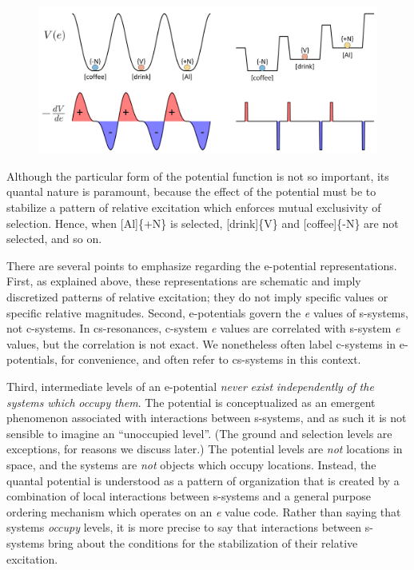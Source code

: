   
\begin{figure}
\includegraphics[width=\textwidth]{figures/Tilsen-img24.png}
\caption{\missingcaption}
\label{fig:}
\end{figure}
 

  Although the particular form of the potential function is not so important, its quantal nature is paramount, because the effect of the potential must be to stabilize a pattern of relative excitation which enforces mutual exclusivity of selection. Hence, when [Al]\{+N\} is selected, [drink]\{V\} and [coffee]\{-N\} are not selected, and so on. 

  There are several points to emphasize regarding the e-potential representations. First, as explained above, these representations are schematic and imply discretized patterns of relative excitation; they do not imply specific values or specific relative magnitudes. Second, e-potentials govern the \textit{e} values of s-systems, not c-systems. In cs-resonances, c-system \textit{e} values are correlated with s-system \textit{e} values, but the correlation is not exact. We nonetheless often label c-systems in e-potentials, for convenience, and often refer to cs-systems in this context. 

  Third, intermediate levels of an e-potential \textit{never} \textit{exist} \textit{independently} \textit{of} \textit{the} \textit{systems} \textit{which} \textit{occupy} \textit{them}. The potential is conceptualized as an emergent phenomenon associated with interactions between s-systems, and as such it is not sensible to imagine an “unoccupied level”. (The ground and selection levels are exceptions, for reasons we discuss later.) The potential levels are \textit{not} locations in space, and the systems are \textit{not} objects which occupy locations. Instead, the quantal potential is understood as a pattern of organization that is created by a combination of local interactions between s-systems and a general purpose ordering mechanism which operates on an \textit{e} value code. Rather than saying that systems \textit{occupy} levels, it is more precise to say that interactions between s-systems bring about the conditions for the stabilization of their relative excitation.

